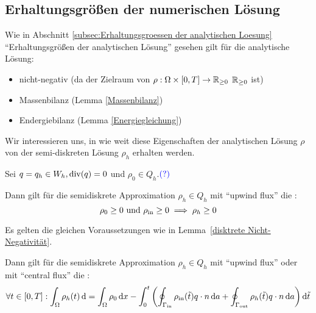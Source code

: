\subsection{Erhaltungsgrößen der numerischen Lösung}

\begin{repetition}
	Wie in Abschnitt \ref{subsec:Erhaltungsgroessen der analytischen Loesung} \enquote{Erhaltungsgrößen der analytischen Lösung} gesehen gilt für die analytische Lösung:
	\begin{itemize}
		\item nicht-negativ (da der Zielraum von $ \rho: \Omega \times [0,T] \to \mathbb{R}_{\geq 0}$ $ \mathbb{R}_{\geq 0} $ ist)
		\item Massenbilanz (Lemma \ref{Massenbilanz})
		\item Endergiebilanz (Lemma \ref{Energiegleichung})
	\end{itemize}
\end{repetition}

Wir interessieren uns, in wie weit diese Eigenschaften der analytischen Lösung $ \rho $ von der semi-diskreten Lösung $ \rho_h $ erhalten werden.


 
\begin{Lemma} \label{disktrete Nicht-Negativität}
		Sei $ q = q_h \in W_h, \operatorname{div}(q) = 0 $ und $ \rho_0 \in Q_h $.$ \textcolor{blue}{(?)} $ %
	
	Dann gilt für die semidiskrete Approximation $ \rho_h \in Q_h$ mit \enquote{upwind flux} die :
	\[ \rho_0 \geq 0 \text{ und } \rho_{\text{in}} \geq 0 \implies \rho_h \geq 0 \]
\end{Lemma}

\begin{Lemma} \label{diskrete Massenbilanz}
	Es gelten die gleichen Voraussetzungen wie in Lemma~\ref{disktrete Nicht-Negativität}.
	
	Dann gilt für die semidiskrete Approximation $ \rho_h \in Q_h$ mit \enquote{upwind flux} oder mit \enquote{central flux} die :
	\[\forall t \in [0,T]: \int_\Omega \rho_h(t) \mathop{}\!\mathrm{d}   = \int_\Omega \rho_0 \mathop{}\!\mathrm{d} x - \int_{0}^{t} \left( \oint_{\Gamma_{{\text{in}}}} \rho_{\text{in}}(\tilde{t}) q \cdot n \mathop{}\!\mathrm{d} a + \oint_{\Gamma_{{\text{out}}}} \rho_h(\tilde{t}) q \cdot n \mathop{}\!\mathrm{d} a  \right) \mathop{}\!\mathrm{d} \tilde{t} \]
\end{Lemma}

